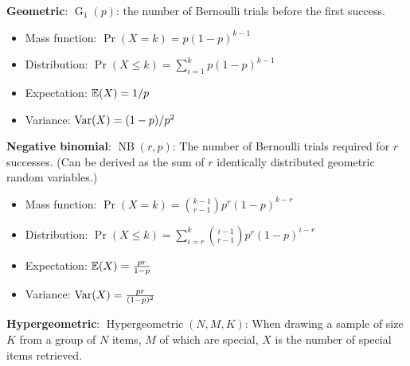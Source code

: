 \textbf{Geometric}:  \(\operatorname{G}_1(p)\): the number of Bernoulli trials before the first success.

\begin{itemize}

\item Mass function: \(\Pr(X = k) = p(1-p)^{k-1} \)

\item Distribution: \(\Pr(X \leq k) = \sum_{i=1}^k p(1-p)^{k-1}  \)

\item Expectation: \(\E(X) = 1/p \)

\item Variance: \(\Var(X) = (1-p)/p^2\)

\end{itemize}


\textbf{Negative binomial}: \( \operatorname{NB}(r, p)\): The number of Bernoulli trials required for \(r\) successes. (Can be derived as the sum of \(r\) identically distributed geometric random variables.)

\begin{itemize}

\item Mass function: \(\Pr(X = k) =  \binom{k-1}{r-1} p^r (1-p)^{k-r}\)

\item Distribution: \(\Pr(X \leq k) = \sum_{i=r}^k \binom{i-1}{r-1} p^r (1-p)^{i-r} \)

\item Expectation: \(\E(X) = \frac{pr}{1-p}\)

\item Variance: \(\Var(X) =  \frac{pr}{(1-p)^2}\)

\end{itemize}


\textbf{Hypergeometric}: \( \operatorname{Hypergeometric}(N, M, K)\): When drawing a sample of size \(K\) from a group of \(N\) items, \(M\) of which are special, \(X\) is the number of special items retrieved.

